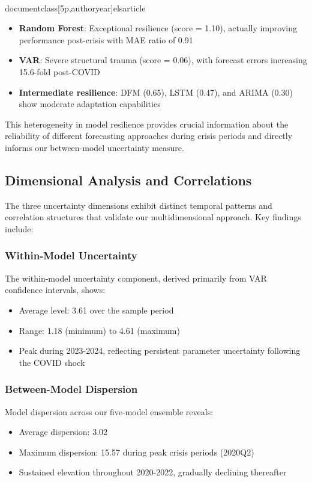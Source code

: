\\documentclass[5p,authoryear]{elsarticle}
\begin{document}
{\begin{itemize}
    \item \textbf{Random Forest}: Exceptional resilience (score = 1.10), actually improving performance post-crisis with MAE ratio of 0.91
    \item \textbf{VAR}: Severe structural trauma (score = 0.06), with forecast errors increasing 15.6-fold post-COVID
    \item \textbf{Intermediate resilience}: DFM (0.65), LSTM (0.47), and ARIMA (0.30) show moderate adaptation capabilities
\end{itemize}

This heterogeneity in model resilience provides crucial information about the reliability of different forecasting approaches during crisis periods and directly informs our between-model uncertainty measure.

\subsection{Dimensional Analysis and Correlations}

The three uncertainty dimensions exhibit distinct temporal patterns and correlation structures that validate our multidimensional approach. Key findings include:

\subsubsection{Within-Model Uncertainty}
The within-model uncertainty component, derived primarily from VAR confidence intervals, shows:
\begin{itemize}
    \item Average level: 3.61 over the sample period
    \item Range: 1.18 (minimum) to 4.61 (maximum)
    \item Peak during 2023-2024, reflecting persistent parameter uncertainty following the COVID shock
\end{itemize}

\subsubsection{Between-Model Dispersion}
Model dispersion across our five-model ensemble reveals:
\begin{itemize}
    \item Average dispersion: 3.02 
    \item Maximum dispersion: 15.57 during peak crisis periods (2020Q2)
    \item Sustained elevation throughout 2020-2022, gradually declining thereafter
\end{itemize}

}
\end{document}
